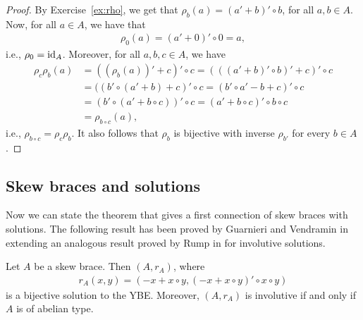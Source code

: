     \begin{proof}
    By Exercise~\ref{ex:rho}, we get that $\rho_b(a)=(a'+b)'\circ b$, for all $a,b\in A$.
    Now, for all $a\in A$, we have that 
    \begin{align*}
        \rho_0(a) = (a'+0)'\circ 0 = a,
    \end{align*}
    i.e., $\rho_0=\operatorname{id}_A$. Moreover, for all $a,b,c\in A$, we have
    \begin{align*}
        \rho_c\rho_b(a)&=((\rho_b(a))'+c)'\circ c
        = (((a'+b)'\circ b)' + c)' \circ c\\
        &= ((b'\circ (a'+b) + c)'\circ c
        = (b'\circ a' - b + c)' \circ c\\
        &= (b'\circ(a' +b\circ c))'\circ c
        = (a' +b\circ c)'\circ b \circ c\\
        &= \rho_{b\circ c}(a),
    \end{align*}
    i.e., $\rho_{b\circ c} = \rho_c\rho_b$. It also follows that $\rho_b$ is bijective with inverse $\rho_{b'}$ for every $b\in A$.
    \end{proof}

    \subsection{Skew braces and solutions}
    
    Now we can state the theorem that gives a first connection of skew braces with solutions. 
    The following result has been proved by Guarnieri and Vendramin in \cite{MR3647970} extending an analogous result proved by Rump in \cite{MR2278047} for involutive solutions.  

    \begin{theorem}
        Let $A$ be a skew brace. Then $(A,r_A)$, where 
        \begin{align*}
            r_A(x, y) = (-x + x\circ y, (-x + x \circ y)'\circ x\circ y)
        \end{align*}
        is a bijective solution to the YBE.
        Moreover, $(A, r_A)$ is involutive if and only if $A$ is of abelian type.
    \end{theorem}


